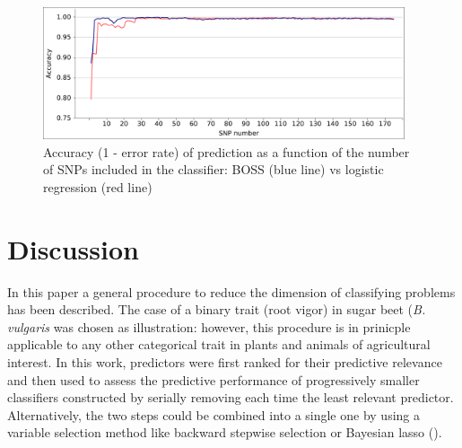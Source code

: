 \begin{figure}
\includegraphics[width=0.95\textwidth]{accuracy.pdf}
\caption{Accuracy (1 - error rate) of prediction as a function of the
  number of SNPs included in the classifier: BOSS (blue line) vs
  logistic regression (red line)}
\label{fig:accuracy}       %
\end{figure}


\section{Discussion}
\label{sec:discussion}
In this paper a general procedure to reduce the dimension of classifying
problems has been described. The case of a binary trait (root vigor) in sugar beet
(\emph{B. vulgaris} was chosen as illustration: however, this procedure
is in prinicple applicable to any other categorical trait in plants and
animals of agricultural interest.
In this work, predictors were first ranked for their predictive
relevance and then used to assess the predictive performance of
progressively smaller classifiers constructed by serially removing each
time the least relevant predictor. Alternatively, the two steps could be
combined into a single one by using a variable selection method like
backward stepwise selection or Bayesian lasso (\cite{hastie2009model}). 

  
